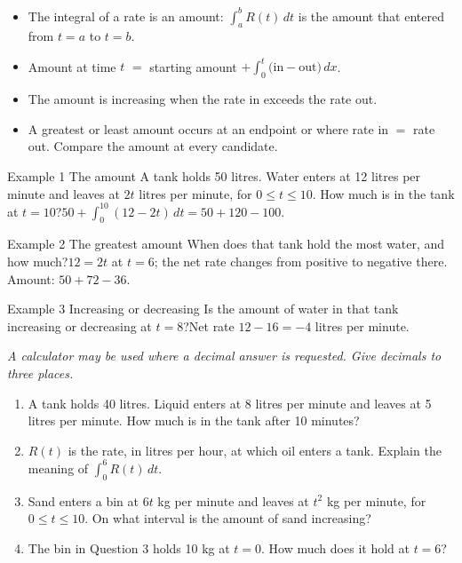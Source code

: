 \documentclass[11pt]{article}
\begin{document}

\begin{ideabox}
\begin{itemize}[leftmargin=*,itemsep=2pt,topsep=2pt]
  \item The integral of a rate is an amount: $\displaystyle\int_{a}^{b}R(t)\,dt$ is the amount that entered from $t=a$ to $t=b$.
  \item Amount at time $t$ $=$ starting amount $+\displaystyle\int_{0}^{t}\big(\text{in}-\text{out}\big)\,dx$.
  \item The amount is increasing when the rate in exceeds the rate out.
  \item A greatest or least amount occurs at an endpoint or where rate in $=$ rate out. Compare the amount at every candidate.
\end{itemize}
\end{ideabox}

\begin{example}{Example 1 \textperiodcentered{} The amount}
A tank holds 50 litres. Water enters at 12 litres per minute and leaves at $2t$ litres per minute, for $0\le t\le10$. How much is in the tank at $t=10$?\soln $50+\displaystyle\int_{0}^{10}(12-2t)\,dt=50+120-100$.
\end{example}

\begin{example}{Example 2 \textperiodcentered{} The greatest amount}
When does that tank hold the most water, and how much?\soln $12=2t$ at $t=6$; the net rate changes from positive to negative there. Amount: $50+72-36$.
\end{example}

\begin{example}{Example 3 \textperiodcentered{} Increasing or decreasing}
Is the amount of water in that tank increasing or decreasing at $t=8$?\soln Net rate $12-16=-4$ litres per minute.
\end{example}

\newpage
{}
\emph{A calculator may be used where a decimal answer is requested. Give decimals to three places.}
\begin{enumerate}[leftmargin=*,itemsep=2pt]
  \item A tank holds 40 litres. Liquid enters at 8 litres per minute and leaves at 5 litres per minute. How much is in the tank after 10 minutes?\work{2.3cm}
  \item $R(t)$ is the rate, in litres per hour, at which oil enters a tank. Explain the meaning of $\displaystyle\int_{0}^{6}R(t)\,dt$.\work{2.3cm}
  \item Sand enters a bin at $6t$ kg per minute and leaves at $t^2$ kg per minute, for $0\le t\le10$. On what interval is the amount of sand increasing?\work{2.3cm}
  \item The bin in Question 3 holds 10 kg at $t=0$. How much does it hold at $t=6$?\work{2.3cm}
\end{enumerate}
\end{document}

